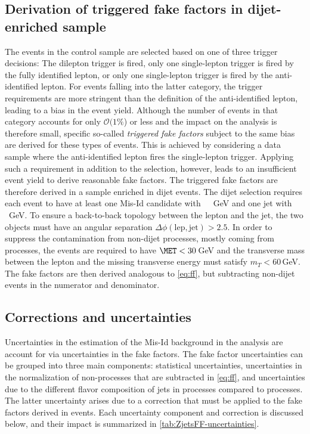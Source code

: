 \subsection{Derivation of triggered fake factors in dijet-enriched sample}
The events in the control sample are selected based on one of three trigger decisions: The dilepton trigger is fired, only one single-lepton trigger is fired by the fully identified lepton, or only one single-lepton trigger is fired by the anti-identified lepton.
For events falling into the latter category, the trigger requirements are more stringent than the definition of the anti-identified lepton, leading to a bias in the event yield.
Although the number of events in that category accounts for only $\mathcal{O}(1\%$) or less and the impact on the analysis is therefore small, specific so-called \emph{triggered fake factors} subject to the same bias are derived for these types of events. This is achieved by considering a data sample where the anti-identified lepton fires the single-lepton trigger.
    Applying such a requirement in addition to the \Zjets selection, however, leads to an insufficient event yield to derive reasonable fake factors. The triggered fake factors are therefore derived in a sample enriched in dijet events.
    The dijet selection requires each event to have at least one Mis-Id candidate with ~\,~GeV and one jet with ~\,~GeV. To ensure a back-to-back topology between the lepton and the jet, the two objects must have an angular separation $\Delta \phi(\text{lep}, \text{jet}) > 2.5$.
    In order to suppress the contamination from non-dijet processes, mostly coming from \Wjets processes, the events are required to have $\MET < 30$\,GeV and the transverse mass between the lepton and the missing transverse energy must satisfy $m_T < 60\,$GeV.
    The fake factors are then derived analogous to \cref{eq:ff}, but subtracting non-dijet events in the numerator and denominator.


    \subsection{Corrections and uncertainties}
    Uncertainties in the estimation of the Mis-Id background in the analysis are account for via uncertainties in the fake factors.
    The fake factor uncertainties can be grouped into three main components: statistical uncertainties, uncertainties in the normalization of non-\Zjets processes that are subtracted in \cref{eq:ff}, and uncertainties due to the different flavor composition of jets in \Zjets processes compared to \Wjets processes.
    The latter uncertainty arises due to a correction that must be applied to the fake factors derived in \Zjets events.
    Each uncertainty component and correction is discussed below, and their impact is summarized in \cref{tab:ZjetsFF-uncertainties}.


